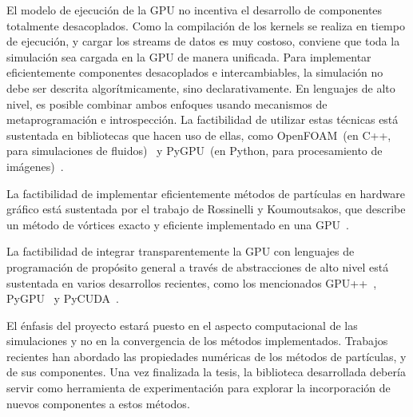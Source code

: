 \documentclass[11pt,spanish]{article}
\begin{document}


El modelo de ejecución de la GPU no incentiva el desarrollo de componentes
totalmente desacoplados.  Como la compilación de los kernels se realiza en tiempo
de ejecución, y cargar los streams de datos es muy costoso, conviene
que toda la simulación sea cargada en la GPU de manera unificada.  Para
implementar eficientemente componentes desacoplados e intercambiables,
la simulación no debe ser descrita algorítmicamente, sino declarativamente.  En
lenguajes de alto nivel, es posible combinar ambos enfoques usando mecanismos de
metaprogramación e introspección.  La factibilidad de utilizar estas técnicas
está sustentada en bibliotecas que hacen uso de ellas, como OpenFOAM~(en C++,
para simulaciones de fluidos)~\cite{openfoam} y PyGPU~(en Python, para
procesamiento de imágenes)~\cite{pygpu}.

La factibilidad de implementar eficientemente métodos de partículas en hardware
gráfico está sustentada por el trabajo de Rossinelli y Koumoutsakos, que
describe un método de vórtices exacto y eficiente implementado en una
GPU~\cite{vortex-gpu}.

La factibilidad de integrar transparentemente la GPU con lenguajes de
programación de propósito general a través de abstracciones de alto nivel está
sustentada en varios desarrollos recientes, como los mencionados
GPU++~\cite{gpupp}, PyGPU~\cite{pygpu} y PyCUDA~\cite{pycuda}.

El énfasis del proyecto estará puesto en el aspecto computacional de las
simulaciones y no en la convergencia de los métodos implementados.  Trabajos
recientes han abordado las propiedades numéricas de los métodos de partículas, y
de sus componentes.  Una vez finalizada la tesis, la biblioteca desarrollada
debería servir como herramienta de experimentación para explorar la
incorporación de nuevos componentes a estos métodos.
\end{document}
